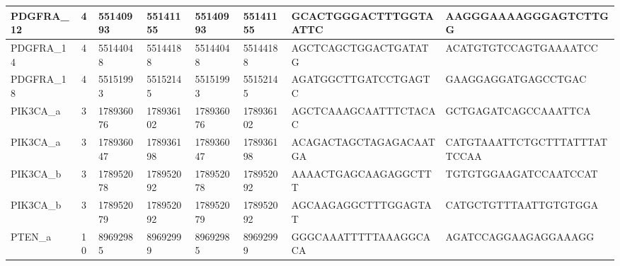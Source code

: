 \begin{landscape}
\begin{longtable}{| p{} | p{} | p{} | p{} | p{} | p{} | p{} | p{} |}
\multicolumn{1}{|l|}{PDGFRA\_12} & \multicolumn{1}{c|}{4}  & \multicolumn{1}{l|}{55140993}  & \multicolumn{1}{l|}{55141155}  & \multicolumn{1}{l|}{55140993}  & \multicolumn{1}{l|}{55141155}  & \multicolumn{1}{l|}{GCACTGGGACTTTGGTAATTC}           & \multicolumn{1}{l|}{AAGGGAAAAGGGAGTCTTGG}          \\ \hline
\multicolumn{1}{|l|}{PDGFRA\_14} & \multicolumn{1}{c|}{4}  & \multicolumn{1}{l|}{55144048}  & \multicolumn{1}{l|}{55144188}  & \multicolumn{1}{l|}{55144048}  & \multicolumn{1}{l|}{55144188}  & \multicolumn{1}{l|}{AGCTCAGCTGGACTGATATG}            & \multicolumn{1}{l|}{ACATGTGTCCAGTGAAAATCC}         \\ \hline
\multicolumn{1}{|l|}{PDGFRA\_18} & \multicolumn{1}{c|}{4}  & \multicolumn{1}{l|}{55151993}  & \multicolumn{1}{l|}{55152145}  & \multicolumn{1}{l|}{55151993}  & \multicolumn{1}{l|}{55152145}  & \multicolumn{1}{l|}{AGATGGCTTGATCCTGAGTC}            & \multicolumn{1}{l|}{GAAGGAGGATGAGCCTGAC}           \\ \hline
\multicolumn{1}{|l|}{PIK3CA\_a}  & \multicolumn{1}{c|}{3}  & \multicolumn{1}{l|}{178936076} & \multicolumn{1}{l|}{178936102} & \multicolumn{1}{l|}{178936076} & \multicolumn{1}{l|}{178936102} & \multicolumn{1}{l|}{AGCTCAAAGCAATTTCTACAC}           & \multicolumn{1}{l|}{GCTGAGATCAGCCAAATTCA}          \\ \hline
\multicolumn{1}{|l|}{PIK3CA\_a}  & \multicolumn{1}{c|}{3}  & \multicolumn{1}{l|}{178936047} & \multicolumn{1}{l|}{178936198} & \multicolumn{1}{l|}{178936047} & \multicolumn{1}{l|}{178936198} & \multicolumn{1}{l|}{ACAGACTAGCTAGAGACAATGA}          & \multicolumn{1}{l|}{CATGTAAATTCTGCTTTATTTATTCCAA}  \\ \hline
\multicolumn{1}{|l|}{PIK3CA\_b}  & \multicolumn{1}{c|}{3}  & \multicolumn{1}{l|}{178952078} & \multicolumn{1}{l|}{178952092} & \multicolumn{1}{l|}{178952078} & \multicolumn{1}{l|}{178952092} & \multicolumn{1}{l|}{AAAACTGAGCAAGAGGCTTT}            & \multicolumn{1}{l|}{TGTGTGGAAGATCCAATCCAT}         \\ \hline
\multicolumn{1}{|l|}{PIK3CA\_b}  & \multicolumn{1}{c|}{3}  & \multicolumn{1}{l|}{178952079} & \multicolumn{1}{l|}{178952092} & \multicolumn{1}{l|}{178952079} & \multicolumn{1}{l|}{178952092} & \multicolumn{1}{l|}{AGCAAGAGGCTTTGGAGTAT}            & \multicolumn{1}{l|}{CATGCTGTTTAATTGTGTGGA}         \\ \hline
\multicolumn{1}{|l|}{PTEN\_a}    & \multicolumn{1}{c|}{10} & \multicolumn{1}{l|}{89692985}  & \multicolumn{1}{l|}{89692999}  & \multicolumn{1}{l|}{89692985}  & \multicolumn{1}{l|}{89692999}  & \multicolumn{1}{l|}{GGGCAAATTTTTAAAGGCACA}           & \multicolumn{1}{l|}{AGATCCAGGAAGAGGAAAGG}          \\ \hline

\end{longtable}
\end{landscape}

